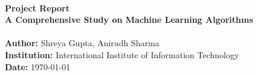\begin{titlepage}
    \centering
    \HRule \\[0.5cm]
    {\Huge \bfseries Project Report \\[0.4cm]
    \Large A Comprehensive Study on Machine Learning Algorithms}\\[0.5cm]
    \HRule \\[1.5cm]

    \textbf{Author:} Shreya Gupta, Anirudh Sharma \\[0.5cm]
    \textbf{Institution:} International Institute of Information Technology \\[0.5cm]
    \textbf{Date:} \today \\[2cm]

    \vfill
\end{titlepage}
